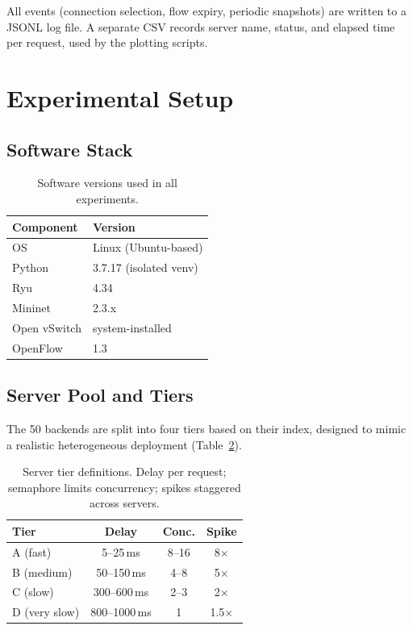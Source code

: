 \documentclass[10pt,a4paper,twocolumn]{article}
\numberwithin{figure}{section}
\numberwithin{table}{section}
\numberwithin{equation}{section}
\begin{document}
All events (connection selection, flow expiry, periodic snapshots) are written to
a JSONL log file. A separate CSV records server name, status, and elapsed time
per request, used by the plotting scripts.

\section{Experimental Setup}
\label{sec:setup}

\subsection{Software Stack}

\begin{table}[H]
\centering
\caption{Software versions used in all experiments.}
\label{tab:stack}
\begin{tabular}{ll}
\toprule
\textbf{Component} & \textbf{Version} \\
\midrule
OS           & Linux (Ubuntu-based) \\
Python       & 3.7.17 (isolated venv) \\
Ryu          & 4.34 \\
Mininet      & 2.3.x \\
Open vSwitch & system-installed \\
OpenFlow     & 1.3 \citep{of13spec} \\
\bottomrule
\end{tabular}
\end{table}

\subsection{Server Pool and Tiers}

The 50 backends are split into four tiers based on their index, designed to
mimic a realistic heterogeneous deployment (Table~\ref{tab:tiers}).

\begin{table}[t]
\centering\footnotesize
\caption{Server tier definitions. Delay per request; semaphore limits
  concurrency; spikes staggered across servers.}
\label{tab:tiers}
\setlength{\tabcolsep}{4pt}
\begin{tabular}{lccc}
\toprule
\textbf{Tier} & \textbf{Delay} & \textbf{Conc.} & \textbf{Spike} \\
\midrule
A (fast)      & 5--25\,ms     & 8--16 & 8$\times$ \\
B (medium)    & 50--150\,ms   & 4--8  & 5$\times$ \\
C (slow)      & 300--600\,ms  & 2--3  & 2$\times$ \\
D (very slow) & 800--1000\,ms & 1     & 1.5$\times$ \\
\bottomrule
\end{tabular}
\end{table}
\end{document}
